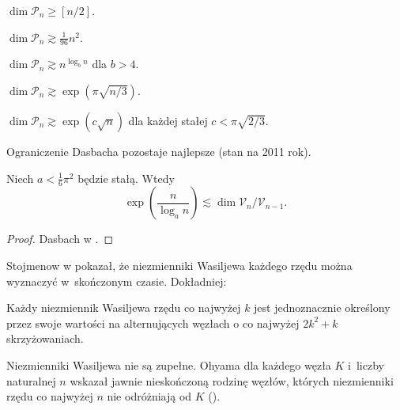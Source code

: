 \begin{proposition}
    $\dim \mathcal P_n \ge [n/2]$.
\end{proposition}

\begin{proposition}[Duzhin, 1996]
    $\dim \mathcal P_n \gtrsim \frac{1}{96} n^2$.
\end{proposition}

\begin{proposition}
    $\dim \mathcal P_n \gtrsim n^{\log_b n}$ dla $b > 4$.
\end{proposition}

\begin{proposition}[Koncewicz, 1997]
    $\dim \mathcal P_n \gtrsim \exp (\pi \sqrt{n/3})$.
\end{proposition}

\begin{proposition}[Dasbach, 2000]
    $\dim \mathcal P_n \gtrsim \exp (c \sqrt{n})$ dla każdej stałej $c < \pi \sqrt{2/3}$.
\end{proposition}

Ograniczenie Dasbacha pozostaje najlepsze (stan na 2011 rok).

\begin{corollary}
    Niech $a < \frac 1 6 \pi^2$ będzie stałą.
    Wtedy
    \begin{equation}
        \exp \left(\frac {n}{\log_a n} \right) \lesssim \dim \mathcal V_n / \mathcal V_{n-1}.
    \end{equation}
\end{corollary}

\begin{proof}
    Dasbach w \cite{dasbach00}.
\end{proof}

Stojmenow w \cite{stoimenow_01} pokazał, że niezmienniki Wasiljewa każdego rzędu można wyznaczyć w~skończonym czasie.
Dokładniej:

\begin{proposition}
    Każdy niezmiennik Wasiljewa rzędu co najwyżej $k$ jest jednoznacznie określony przez swoje wartości na alternujących węzłach o co najwyżej $2k^2 + k$ skrzyżowaniach.
\end{proposition}

Niezmienniki Wasiljewa nie są zupełne.
Ohyama dla każdego węzła $K$ i~liczby naturalnej $n$ wskazał jawnie nieskończoną rodzinę węzłów, których niezmienniki rzędu co najwyżej $n$ nie odróżniają od $K$ (\cite{ohyama95}).

